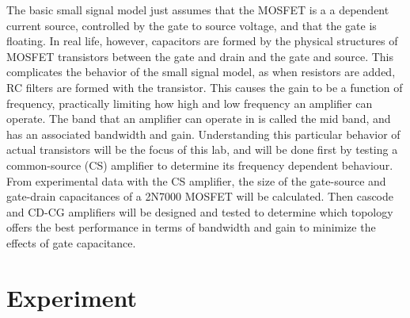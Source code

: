 \documentclass[12pt]{article}
\begin{document}
The basic small signal model just assumes that the MOSFET is a a dependent current source, controlled by the gate to source voltage, and that the gate is floating. In real life, however, capacitors are formed by the physical structures of MOSFET transistors between the gate and drain and the gate and source. This complicates the behavior of the small signal model, as when resistors are added, RC filters are formed with the transistor. This causes the gain to be a function of frequency, practically limiting how high and low frequency an amplifier can operate. The band that an amplifier can operate in is called the mid band, and has an associated bandwidth and gain. Understanding this particular behavior of actual transistors will be the focus of this lab, and will be done first by testing a common-source (CS) amplifier to determine its frequency dependent behaviour. From experimental data with the CS amplifier, the size of the gate-source and gate-drain capacitances of a 2N7000 MOSFET will be calculated. Then cascode and CD-CG amplifiers will be designed and tested to determine which topology offers the best performance in terms of bandwidth and gain to minimize the effects of gate capacitance.
\section{Experiment}
\end{document}
